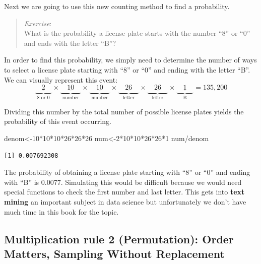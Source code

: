 \documentclass[
  letterpaper,
  DIV=11,
  numbers=noendperiod]{scrreprt}
\newenvironment{Shaded}{\begin{snugshade}}{\end{snugshade}}
\newcommand{\DecValTok}[1]{\textcolor[rgb]{0.68,0.00,0.00}{#1}}
\newcommand{\NormalTok}[1]{\textcolor[rgb]{0.00,0.23,0.31}{#1}}
\newcommand{\OtherTok}[1]{\textcolor[rgb]{0.00,0.23,0.31}{#1}}
\newcommand{\SpecialCharTok}[1]{\textcolor[rgb]{0.37,0.37,0.37}{#1}}
\begin{document}
Next we are going to use this new counting method to find a probability.

\begin{quote}
\emph{Exercise}:\\
What is the probability a license plate starts with the number ``8'' or
``0'' and ends with the letter ``B''?
\end{quote}

In order to find this probability, we simply need to determine the
number of ways to select a license plate starting with ``8'' or ``0''
and ending with the letter ``B''. We can visually represent this event:
\[
\underbrace{\underline{\quad 2 \quad }}_\text{8 or 0} \times \underbrace{\underline{\quad 10 \quad }}_\text{number} \times \underbrace{\underline{\quad 10 \quad }}_\text{number} \times \underbrace{\underline{\quad 26 \quad }}_\text{letter} \times \underbrace{\underline{\quad 26 \quad }}_\text{letter} \times \underbrace{\underline{\quad 1 \quad }}_\text{B} = 135,200
\]

Dividing this number by the total number of possible license plates
yields the probability of this event occurring.

\begin{Shaded}
\begin{Highlighting}[]
\NormalTok{denom}\OtherTok{\textless{}{-}}\DecValTok{10}\SpecialCharTok{*}\DecValTok{10}\SpecialCharTok{*}\DecValTok{10}\SpecialCharTok{*}\DecValTok{26}\SpecialCharTok{*}\DecValTok{26}\SpecialCharTok{*}\DecValTok{26}
\NormalTok{num}\OtherTok{\textless{}{-}}\DecValTok{2}\SpecialCharTok{*}\DecValTok{10}\SpecialCharTok{*}\DecValTok{10}\SpecialCharTok{*}\DecValTok{26}\SpecialCharTok{*}\DecValTok{26}\SpecialCharTok{*}\DecValTok{1}
\NormalTok{num}\SpecialCharTok{/}\NormalTok{denom}
\end{Highlighting}
\end{Shaded}

\begin{verbatim}
[1] 0.007692308
\end{verbatim}

The probability of obtaining a license plate starting with ``8'' or
``0'' and ending with ``B'' is 0.0077. Simulating this would be
difficult because we would need special functions to check the first
number and last letter. This gets into \textbf{text mining} an important
subject in data science but unfortunately we don't have much time in
this book for the topic.

\subsection{Multiplication rule 2 (Permutation): Order Matters, Sampling
Without
Replacement}\label{multiplication-rule-2-permutation-order-matters-sampling-without-replacement}
\end{document}

